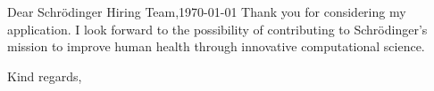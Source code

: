 \documentclass[12pt]{HHUletter}
\begin{document}
\begin{letter}{Dear Schrödinger Hiring Team,\hfill\today}
    Thank you for considering my application. I look forward to the possibility of contributing to Schrödinger's mission to improve human health through innovative computational science.

		\closing{Kind regards,}
		
		
		
		
	\end{letter}
	
\end{document}
